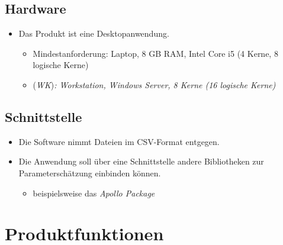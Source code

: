 \documentclass{article}
\begin{document}
\subsection{Hardware}
\begin{itemize}
    \item Das Produkt ist eine Desktopanwendung.
    \begin{itemize}
        \item Mindestanforderung: Laptop, 8 GB RAM, Intel Core i5 (4 Kerne, 8 logische Kerne)
        \item (\textit{WK})\textit{: Workstation, Windows Server, 8 Kerne (16 logische Kerne)}
    \end{itemize}
\end{itemize}
\subsection{Schnittstelle}
\begin{itemize}
    \item Die Software nimmt Dateien im CSV-Format entgegen.
    \item Die Anwendung soll über eine Schnittstelle andere Bibliotheken zur Parameterschätzung einbinden können.
    \begin{itemize}
        \item beispielsweise das \textit{Apollo Package}
    \end{itemize}
\end{itemize}
\newpage

\section{Produktfunktionen}
\end{document}
